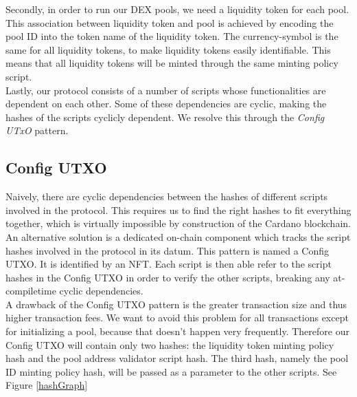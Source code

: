 \documentclass{article}
\begin{document}
Secondly, in order to run our DEX pools, we need a liquidity token for each
pool. This association between liquidity token and pool is achieved by encoding
the pool ID into the token name of the liquidity token. The currency-symbol is
the same for all liquidity tokens, to make liquidity tokens easily identifiable.
This means that all liquidity tokens will be minted through the same minting
policy script. \\

Lastly, our protocol consists of a number of scripts whose functionalities are
dependent on each other. Some of these dependencies are cyclic, making the
hashes of the scripts cyclicly dependent. We resolve this through the
\textit{Config UTxO} pattern.

\subsection{Config UTXO}

Naively, there are cyclic dependencies between the hashes of different scripts
involved in the protocol. This requires us to find the right hashes to fit
everything together, which is virtually impossible by construction of the
Cardano blockchain. An alternative solution is a dedicated on-chain component
which tracks the script hashes involved in the protocol in its datum. This
pattern is named a Config UTXO. It is identified by an NFT. Each script is then
able refer to the script hashes in the Config UTXO in order to verify the other
scripts, breaking any at-compiletime cyclic dependencies. \\

A drawback of the Config UTXO pattern is the greater transaction size and thus
higher transaction fees. We want to avoid this problem for all transactions
except for initializing a pool, because that doesn't happen very frequently.
Therefore our Config UTXO will contain only two hashes: the liquidity token
minting policy hash and the pool address validator script hash. The third hash,
namely the pool ID minting policy hash, will be passed as a parameter to the
other scripts. See Figure \ref{hashGraph} \\

\end{document}
